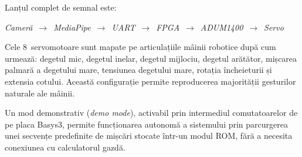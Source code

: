 Lanțul complet de semnal este:
\begin{center}
\mbox{\textit{Cameră} $\rightarrow$ \textit{MediaPipe} $\rightarrow$ \textit{UART} $\rightarrow$ \textit{FPGA} $\rightarrow$ \textit{ADUM1400} $\rightarrow$ \textit{Servo}}
\end{center}

Cele 8~servomotoare sunt mapate pe articulațiile mâinii robotice după cum
urmează: degetul mic, degetul inelar, degetul mijlociu, degetul arătător,
mișcarea palmară a degetului mare, tensiunea degetului mare, rotația
încheieturii și extensia cotului. Această configurație permite reproducerea
majorității gesturilor naturale ale mâinii.

Un mod demonstrativ (\textit{demo mode}), activabil prin intermediul
comutatoarelor de pe placa Basys3, permite funcționarea autonomă a
sistemului prin parcurgerea unei secvențe predefinite de mișcări stocate
într-un modul ROM, fără a necesita conexiunea cu calculatorul gazdă.
